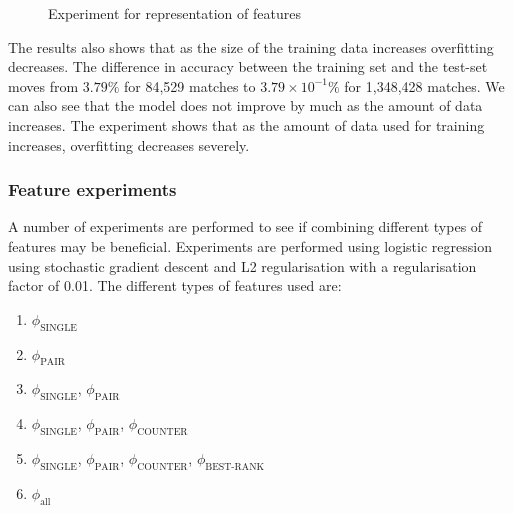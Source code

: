 \begin{figure}[!htb]
  \centering
{}
  \caption{Experiment for representation of features}\label{fig:clusterbigdata}
\end{figure}

The results also shows that as the size of the training data increases overfitting decreases. The difference in accuracy between the training set and the test-set moves from $3.79\%$ for 84,529 matches to $3.79\times10^{-1} \%$ for 1,348,428 matches. We can also see that the model does not improve by much as the amount of data increases. The experiment shows that as the amount of data used for training increases, overfitting decreases severely. 



\subsubsection{Feature experiments}\label{sec:feattest}
A number of experiments are performed to see if combining different types of features may be beneficial.
Experiments are performed using logistic regression using stochastic gradient descent and L2 regularisation with a regularisation factor of 0.01. The different types of features used are:
\begin{enumerate}
\item $\phi_\text{SINGLE}$
\item $\phi_\text{PAIR}$
\item $\phi_\text{SINGLE}$, $\phi_\text{PAIR}$
\item $\phi_\text{SINGLE}$, $\phi_\text{PAIR}$, $\phi_\text{COUNTER}$
\item $\phi_\text{SINGLE}$, $\phi_\text{PAIR}$, $\phi_\text{COUNTER}$, $\phi_\text{BEST-RANK}$
\item $\phi_\text{all}$
\end{enumerate}

